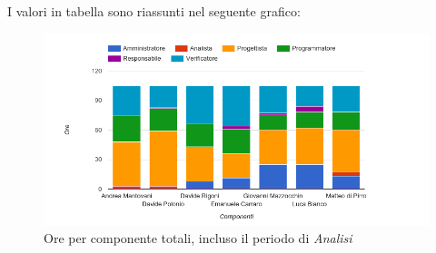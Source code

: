 I valori in tabella sono riassunti nel seguente grafico: \\ 

    \begin{figure}[H]
      \begin{center}
        \includegraphics[width=15cm]{res/img/suddivisioneRuoloProspettoOrario/orePerComponenteTotaliSenzaAnalisi.png}
      \caption{Ore per componente totali, incluso il periodo di \textit{Analisi}}
      \end{center} 
    \end{figure}    
    
    
